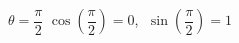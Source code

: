{$\theta = \dfrac{\pi}{2}$}
{$\cos \left(\dfrac{\pi}{2}\right) = 0$, $\; \sin \left(\dfrac{\pi}{2}\right) = 1$ }
